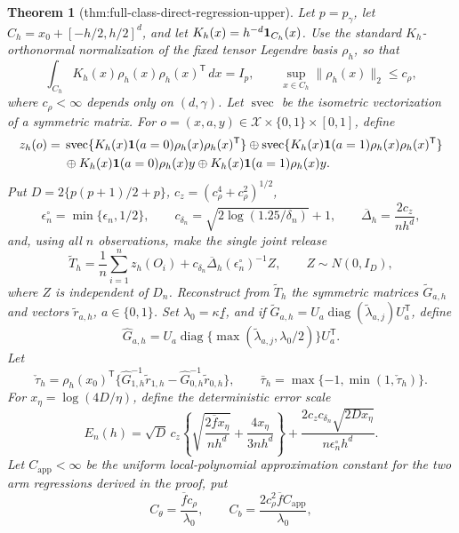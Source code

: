 \documentclass{article}
\newtheorem{theorem}{Theorem}
\begin{document}
\begin{theorem}[thm:full-class-direct-regression-upper]\label{thm:full-class-direct-regression-upper}
Let \(p=p_\gamma\), let \(C_h=x_0+[-h/2,h/2]^d\), and let \(K_h(x)=h^{-d}{\bf1}_{C_h}(x)\).  Use the standard \(K_h\)-orthonormal normalization of the fixed tensor Legendre basis \(\rho_h\), so that
\[
 \int_{C_h}K_h(x)\rho_h(x)\rho_h(x)^{\mathsf T}\,dx=I_p,
 \qquad
 \sup_{x\in C_h}\|\rho_h(x)\|_2\le c_\rho,
\]
where \(c_\rho<\infty\) depends only on \((d,\gamma)\).  Let \(\operatorname{svec}\) be the isometric vectorization of a symmetric matrix.  For \(o=(x,a,y)\in\mathcal X\times\{0,1\}\times[0,1]\), define
\[
 \begin{aligned}
 z_h(o)={}&\operatorname{svec}\{K_h(x){\bf1}(a=0)\rho_h(x)\rho_h(x)^{\mathsf T}\}
 \mathbin\oplus
 \operatorname{svec}\{K_h(x){\bf1}(a=1)\rho_h(x)\rho_h(x)^{\mathsf T}\}\\
 &\mathbin\oplus K_h(x){\bf1}(a=0)\rho_h(x)y
 \mathbin\oplus K_h(x){\bf1}(a=1)\rho_h(x)y.
 \end{aligned}
\]
Put \(D=2\{p(p+1)/2+p\}\), \(c_z=(c_\rho^4+c_\rho^2)^{1/2}\),
\[
 \epsilon_n^\circ=\min\{\epsilon_n,1/2\},
 \qquad c_{\delta_n}=\sqrt{2\log(1.25/\delta_n)}+1,
 \qquad \overline\Delta_h=\frac{2c_z}{nh^d},
\]
and, using all \(n\) observations, make the single joint release
\[
 \widetilde T_h=\frac1n\sum_{i=1}^nz_h(O_i)
 +c_{\delta_n}\overline\Delta_h(\epsilon_n^\circ)^{-1}Z,
 \qquad Z\sim N(0,I_D),
\tag{15}
\]
where \(Z\) is independent of \(D_n\).
Reconstruct from \(\widetilde T_h\) the symmetric matrices \(\widetilde G_{a,h}\) and vectors \(\widetilde r_{a,h}\), \(a\in\{0,1\}\).  Set \(\lambda_0=\kappa\underline f\), and if
\(\widetilde G_{a,h}=U_a\operatorname{diag}(\widetilde\lambda_{a,j})U_a^{\mathsf T}\), define
\[
 \widehat G_{a,h}=U_a\operatorname{diag}\{\max(\widetilde\lambda_{a,j},\lambda_0/2)\}U_a^{\mathsf T}.
\]
Let
\[
 \check\tau_h=\rho_h(x_0)^{\mathsf T}
 \{\widehat G_{1,h}^{-1}\widetilde r_{1,h}
   -\widehat G_{0,h}^{-1}\widetilde r_{0,h}\},
 \qquad
 \bar\tau_h=\max\{-1,\min(1,\check\tau_h)\}.
\]
For \(x_\eta=\log(4D/\eta)\), define the deterministic error scale
\[
 E_n(h)=\sqrt D\,c_z\left\{
 \sqrt{\frac{2\overline f x_\eta}{nh^d}}+
 \frac{4x_\eta}{3nh^d}\right\}
 +\frac{2c_zc_{\delta_n}\sqrt{2Dx_\eta}}
 {n\epsilon_n^\circ h^d}.
\tag{16}
\]
Let \(C_{\mathrm{app}}<\infty\) be the uniform local-polynomial approximation constant for the two arm regressions derived in the proof, put
\[
 C_\theta=\frac{\overline f c_\rho}{\lambda_0},
 \qquad
 C_b=\frac{2c_\rho^2\overline f C_{\mathrm{app}}}{\lambda_0},
\]
\end{theorem}
\end{document}
